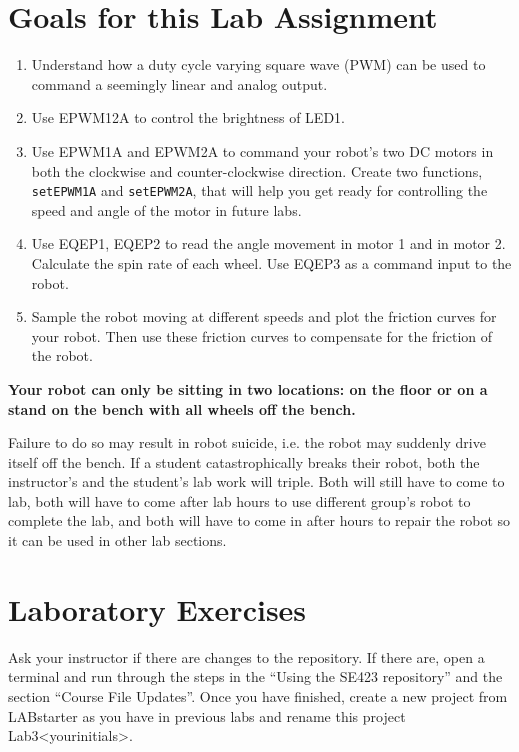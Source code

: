 \documentclass[11pt]{article}
\begin{document}
\MakeAssignmentTitle

\section*{Goals for this Lab Assignment}
%
\begin{enumerate}
    \item Understand how a duty cycle varying square wave (PWM) can be used to command a seemingly linear and analog output.
    \item Use EPWM12A to control the brightness of LED1.
        \item Use EPWM1A and EPWM2A to command your robot’s two DC motors in both the clockwise and counter-clockwise direction. Create two functions, \texttt{setEPWM1A} and \texttt{setEPWM2A}, that will help you get ready for controlling the speed and angle of the motor in future labs.
    \item Use EQEP1, EQEP2 to read the angle movement in motor 1 and in motor 2. Calculate the spin rate of each wheel. Use EQEP3 as a command input to the robot.
    \item Sample the robot moving at different speeds and plot the friction curves for your robot. Then use these friction curves to compensate for the friction of the robot.
\end{enumerate}
%
\begin{center}
    \large\textbf{Your robot can only be sitting in two locations: on the floor or on a stand on the bench with all wheels off the bench.}
\end{center}
%
Failure to do so may result in robot suicide, i.e. the robot may suddenly drive itself off the bench. If a student catastrophically breaks their robot, both the instructor’s and the student’s lab work will triple. Both will still have to come to lab, both will have to come after lab hours to use different group’s robot to complete the lab, and both will have to come in after hours to repair the robot so it can be used in other lab sections.

\section*{Laboratory Exercises}


Ask your instructor if there are changes to the repository. If there are, open a terminal and run through the steps in the “Using the SE423 repository” and the section “Course File Updates”. Once you have finished, create a new project from LABstarter as you have in previous labs and rename this project Lab3\textless yourinitials\textgreater.
\end{document}
